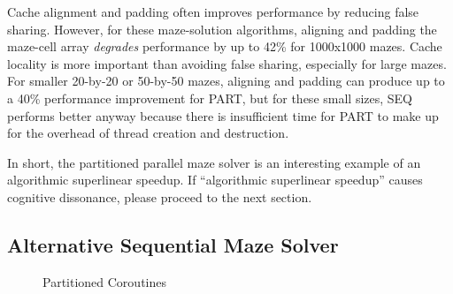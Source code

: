 Cache alignment and padding often improves performance by reducing
false sharing.
However, for these maze-solution algorithms, aligning and padding the
maze-cell array \emph{degrades} performance by up to 42\% for 1000x1000 mazes.
Cache locality is more important than avoiding
false sharing, especially for large mazes.
For smaller 20-by-20 or 50-by-50 mazes, aligning and padding can produce
up to a 40\% performance improvement for PART,
but for these small sizes, SEQ performs better anyway because there
is insufficient time for PART to make up for the overhead of
thread creation and destruction.

In short, the partitioned parallel maze solver is an interesting example
of an algorithmic superlinear speedup.
If ``algorithmic superlinear speedup'' causes cognitive dissonance,
please proceed to the next section.

\subsection{Alternative Sequential Maze Solver}
\label{sec:SMPdesign:Alternative Sequential Maze Solver}

\begin{figure}[tb]
\begin{center}
\end{center}
\caption{Partitioned Coroutines}
\label{fig:SMPdesign:Partitioned Coroutines}
\end{figure}

